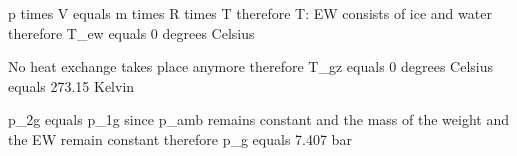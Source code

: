 p times V equals m times R times T therefore T: EW consists of ice and water therefore T_ew equals 0 degrees Celsius  

No heat exchange takes place anymore therefore T_gz equals 0 degrees Celsius equals 273.15 Kelvin  

p_2g equals p_1g since p_amb remains constant and the mass of the weight and the EW remain constant therefore p_g equals 7.407 bar